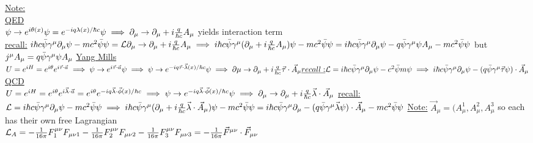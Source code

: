 \documentclass[12pt]{amsart}
\begin{document}
\begin{enumerate}
\underline{Note:}\\
\underline{QED}\\
$\psi \rightarrow e^{i \theta(x)} \psi = e^{-i q \lambda(x)/\hbar c} \psi \implies \partial_{\mu} \rightarrow \partial_{\mu} + i \frac{q}{\hbar c} A_{\mu}\\$
yields interaction term\\
\underline{recall:} $i \hbar c \bar{\psi} \gamma^{\mu} \partial_{\mu} \psi - m c^2 \bar{\psi} \psi = \mathcal{L}\\
\partial_{\mu} \rightarrow \partial_{\mu} + i \frac{q}{\hbar c} A_{\mu}\\
\implies i \hbar c \bar{\psi} \gamma^{\mu} (\partial_{\mu} + i \frac{q}{\hbar c} A_{\mu}) \psi - m c^2 \bar{\psi} \psi\\
= i \hbar c \bar{\psi} \gamma^{\mu} \partial_{\mu} \psi - q \bar{\psi} \gamma^{\mu} \psi A_{\mu} - m c^2 \bar{\psi} \psi\\$
but $j^{\mu} A_{\mu} = q \bar{\psi} \gamma^{\mu} \psi A_{\mu}\\$
\underline{Yang Mills}\\
$U = e^{iH} = e^{i \theta} e^{i \vec{\tau} \cdot \vec{a}}\\
\implies \psi \rightarrow e^{i \vec{\tau} \cdot \vec{a}} \psi\\
\implies \psi \rightarrow e^{-i q \vec{\tau} \cdot \vec{\lambda}(x)/\hbar c} \psi \implies \partial{\mu} \rightarrow \partial_{\mu} + i \frac{q}{\hbar c} \vec{\tau} \cdot \vec{A}_{\mu}\\
\underline{recall:} \mathcal{L} = i \hbar c \bar{\psi} \gamma^{\mu} \partial_{\mu} \psi - c^2 \bar{\psi} m \psi\\
\implies i \hbar c \bar{\psi} \gamma^{\mu} \partial_{\mu} \psi - (q \bar{\psi} \gamma^{\mu} \vec{\tau} \psi) \cdot \vec{A}_{\mu}\\$
\underline{QCD}\\
$U= e^{i H} = e^{i \theta} e^{i \vec{\lambda} \cdot \vec{a}} = e^{i \theta} e^{-i q \vec{\lambda} \cdot \vec{\phi}(x)/\hbar c}\\
\implies \psi \rightarrow e^{-i q \vec{\lambda} \cdot \vec{\phi}(x)/\hbar c} \psi \implies \partial_{\mu} \rightarrow \partial_{\mu} + i \frac{q}{\hbar c} \vec{\lambda} \cdot \vec{A}_{\mu}\\$
\underline{recall:}$ \mathcal{L} = i \hbar c \bar{\psi} \gamma^{\mu} \partial_{\mu} \psi - m c^2 \bar{\psi} \psi\\
\implies i \hbar c \bar{\psi} \gamma^{\mu} (\partial_{\mu} + i \frac{q}{\hbar c} \vec{\lambda} \cdot \vec{A}_{\mu}) \psi - m c^2 \bar{\psi} \psi\\
= i \hbar c \bar{\psi} \gamma^{\mu} \partial_{\mu} - (q \bar{\psi} \gamma^{\mu} \vec{\lambda} \psi)\cdot \vec{A}_{\mu} - mc^2 \bar{\psi} \psi\\$
\underline{Note:} $\vec{A}_{\mu}= (A^1_{\mu}, A^2_{\mu}, A^3_{\mu}$ so each has their own free Lagrangian\\
$\mathcal{L}_A = - \frac{1}{16 \pi} F^{\mu \nu}_1 F_{\mu \nu 1} - \frac{1}{16 \pi} F^{\mu \nu}_2 F_{\mu \nu 2} - \frac{1}{16 \pi} F^{\mu \nu}_3 F_{\mu \nu 3}\\
= - \frac{1}{16 \pi} \vec{F}^{\mu \nu} \cdot \vec{F}_{\mu \nu}$



\end{enumerate}
\end{document}
